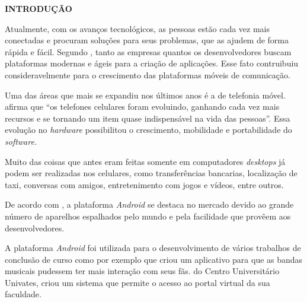   \vspace{1.2em}
  \textbf{\large INTRODUÇÃO}
  \vspace{2.9em}
\thispagestyle{empty}


	\par Atualmente, com os avanços tecnológicos, as pessoas estão cada vez mais
conectadas e procuram soluções para seus problemas, que as ajudem de forma
rápida e fácil. Segundo , tanto as empresas quantos os
desenvolvedores buscam plataformas modernas e ágeis para a criação de
aplicações. Esse fato contruibuiu consideravelmente para o crescimento das
plataformas móveis de comunicação.

	\par Uma das áreas que mais se expandiu nos últimos anos é a de telefonia
móvel. \\ afirma que “os telefones celulares
foram evoluindo, ganhando cada vez mais recursos e se tornando um item quase
indispensável na vida das pessoas”. Essa evolução no \textit{hardware}
possibilitou o crescimento, mobilidade e portabilidade do \textit{software}.

	\par Muito das coisas que antes eram feitas somente em computadores
\textit{desktops} já podem ser realizadas nos celulares, como transferências
bancarias, localização de taxi, conversas com amigos, entretenimento com jogos
e vídeos, entre outros.

	\par De acordo com , a plataforma \textit{Android} se
destaca no mercado devido ao grande número de aparelhos espalhados pelo mundo e
pela facilidade que provêem aos desenvolvedores.

	\par A plataforma \textit{Android} foi utilizada para o desenvolvimento de
vários trabalhos de conclusão de curso como por exemplo 
que criou um aplicativo para que as bandas musicais pudessem ter mais interação com
seus fãs.  do Centro Universitário Univates, criou um
sistema que permite o acesso ao portal virtual da sua faculdade.

